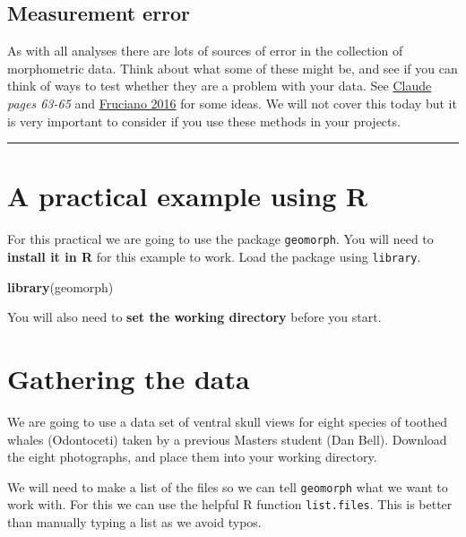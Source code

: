 \documentclass[]{book}
\newenvironment{Shaded}{\begin{snugshade}}{\end{snugshade}}
\newcommand{\KeywordTok}[1]{\textcolor[rgb]{0.13,0.29,0.53}{\textbf{{#1}}}}
\newcommand{\NormalTok}[1]{{#1}}
\begin{document}
\subsection{Measurement error}\label{measurement-error}

As with all analyses there are lots of sources of error in the
collection of morphometric data. Think about what some of these might
be, and see if you can think of ways to test whether they are a problem
with your data. See
\href{http://lib.du.ac.ir/documents/10157/60743/Morphometrics+With+R.pdf}{Claude}
\emph{pages 63-65} and
\href{http://link.springer.com/article/10.1007/s00427-016-0537-4}{Fruciano
2016} for some ideas. We will not cover this today but it is very
important to consider if you use these methods in your projects.

\begin{center}\rule{0.5\linewidth}{\linethickness}\end{center}

\section{A practical example using R}\label{a-practical-example-using-r}

For this practical we are going to use the package \texttt{geomorph}.
You will need to \textbf{install it in R} for this example to work. Load
the package using \texttt{library}.

\begin{Shaded}
\begin{Highlighting}[]
\KeywordTok{library}\NormalTok{(geomorph)}
\end{Highlighting}
\end{Shaded}

You will also need to \textbf{set the working directory} before you
start.

\section{Gathering the data}\label{gathering-the-data}

We are going to use a data set of ventral skull views for eight species
of toothed whales (Odontoceti) taken by a previous Masters student (Dan
Bell). Download the eight photographs, and place them into your working
directory.

We will need to make a list of the files so we can tell
\texttt{geomorph} what we want to work with. For this we can use the
helpful R function \texttt{list.files}. This is better than manually
typing a list as we avoid typos.
\end{document}
